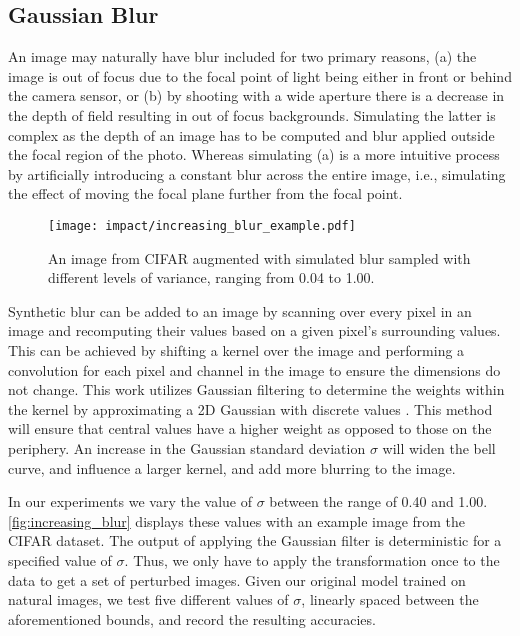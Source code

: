 \documentclass[conference]{IEEEtran}
\begin{document}
\subsection{Gaussian Blur}

An image may naturally have blur included for two primary reasons, (a) the image is out of focus due to the focal point of light being either in front or behind the camera sensor, or (b) by shooting with a wide aperture there is a decrease in the depth of field resulting in out of focus backgrounds. Simulating the latter is complex as the depth of an image has to be computed and blur applied outside the focal region of the photo. Whereas simulating (a) is a more intuitive process by artificially introducing a constant blur across the entire image, i.e., simulating the effect of moving the focal plane further from the focal point.

\begin{figure}[!t]
    \centering
    \texttt{[image: impact/increasing\_blur\_example.pdf]}
    \captionsetup{width=0.90\columnwidth}
    \caption{An image from CIFAR augmented with simulated blur sampled with different levels of variance, ranging from 0.04 to 1.00.}
    \label{fig:increasing_blur}
\end{figure}

Synthetic blur can be added to an image by scanning over every pixel in an image and recomputing their values based on a given pixel's surrounding values. This can be achieved by shifting a kernel over the image and performing a convolution for each pixel and channel in the image to ensure the dimensions do not change. This work utilizes Gaussian filtering to determine the weights within the kernel by approximating a 2D Gaussian with discrete values \cite{gaussian_filtering}. This method will ensure that central values have a higher weight as opposed to those on the periphery. An increase in the Gaussian standard deviation $\sigma$ will widen the bell curve, and influence a larger kernel, and add more blurring to the image.

In our experiments we vary the value of $\sigma$ between the range of 0.40 and 1.00. \autoref{fig:increasing_blur} displays these values with an example image from the CIFAR dataset. The output of applying the Gaussian filter is deterministic for a specified value of $\sigma$. Thus, we only have to apply the transformation once to the data to get a set of perturbed images. Given our original model trained on natural images, we test five different values of $\sigma$, linearly spaced between the aforementioned bounds, and record the resulting accuracies.
\end{document}
